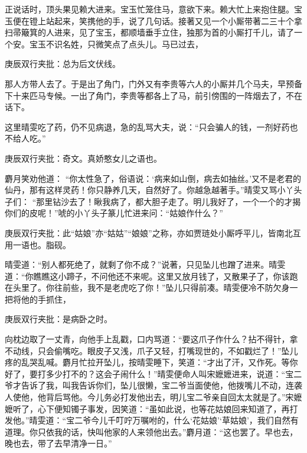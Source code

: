\begin{parag}


    正说话时，顶头果见赖大进来。宝玉忙笼住马，意欲下来。赖大忙上来抱住腿。宝玉便在镫上站起来，笑携他的手，说了几句话。接著又见一个小厮带著二三十个拿扫帚簸箕的人进来，见了宝玉，都顺墙垂手立住，独那为首的小厮打千儿，请了一个安。宝玉不识名姓，只微笑点了点头儿。马已过去，\begin{note}庚辰双行夹批：总为后文伏线。\end{note}那人方带人去了。于是出了角门，门外又有李贵等六人的小厮并几个马夫，早预备下十来匹马专候。一出了角门，李贵等都各上了马，前引傍围的一阵烟去了，不在话下。
\end{parag}


\begin{parag}


    这里晴雯吃了药，仍不见病退，急的乱骂大夫，说：“只会骗人的钱，一剂好药也不给人吃。”\begin{note}庚辰双行夹批：奇文。真娇憨女儿之语也。\end{note}麝月笑劝他道： “你太性急了，俗语说：‘病来如山倒，病去如抽丝。’又不是老君的仙丹，那有这样灵药！你只静养几天，自然好了。你越急越著手。”晴雯又骂小丫头子们： “那里钻沙去了！瞅我病了，都大胆子走了。明儿我好了，一个一个的才揭你们的皮呢！”唬的小丫头子篆儿忙进来问：“姑娘作什么？”\begin{note}庚辰双行夹批：此“姑娘”亦“姑姑”“娘娘”之称，亦如贾琏处小厮呼平儿，皆南北互用一语也。脂砚。\end{note}晴雯道：“别人都死绝了，就剩了你不成？”说著，只见坠儿也蹭了进来。晴雯道：“你瞧瞧这小蹄子，不问他还不来呢。这里又放月钱了，又散果子了，你该跑在头里了。你往前些，我不是老虎吃了你！”坠儿只得前凑。晴雯便冷不防欠身一把将他的手抓住，\begin{note}庚辰双行夹批：是病卧之时。\end{note}向枕边取了一丈青，向他手上乱戳，口内骂道：“要这爪子作什么？拈不得针，拿不动线，只会偷嘴吃。眼皮子又浅，爪子又轻，打嘴现世的，不如戳烂了！”坠儿疼的乱哭乱喊。麝月忙拉开坠儿，按晴雯睡下，笑道：“才出了汗，又作死。等你好了，要打多少打不的？这会子闹什么！”晴雯便命人叫宋嬷嬷进来，说道：“宝二爷才告诉了我，叫我告诉你们，坠儿很懒，宝二爷当面使他，他拨嘴儿不动，连袭人使他，他背后骂他。今儿务必打发他出去，明儿宝二爷亲自回太太就是了。”宋嬷嬷听了，心下便知镯子事发，因笑道：“虽如此说，也等花姑娘回来知道了，再打发他。”晴雯道：“宝二爷今儿千叮咛万嘱咐的，什么‘花姑娘’‘草姑娘’，我们自然有道理。你只依我的话，快叫他家的人来领他出去。”麝月道：“这也罢了。早也去，晚也去，带了去早清净一日。”
\end{parag}


